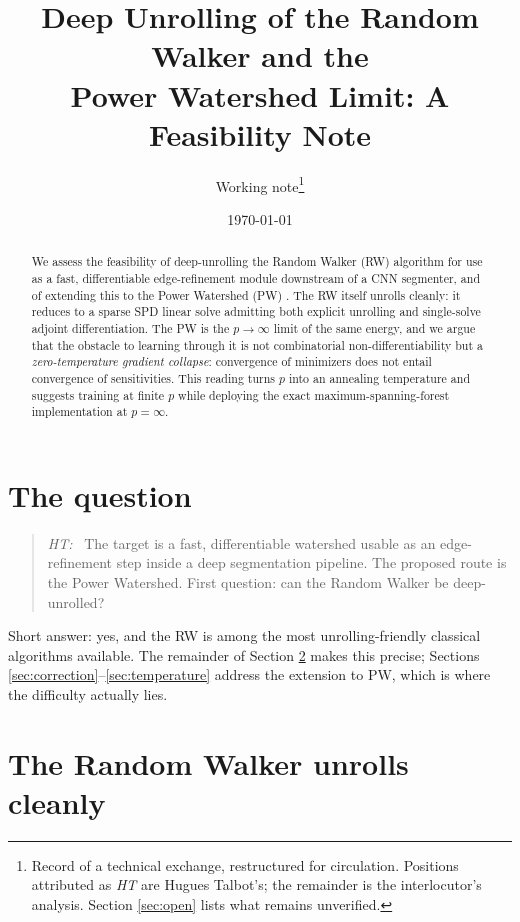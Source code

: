 \documentclass[11pt,a4paper]{article}
\title{Deep Unrolling of the Random Walker and the\\
       Power Watershed Limit: A Feasibility Note}
\author{Working note\thanks{Record of a technical exchange, restructured
        for circulation. Positions attributed as \emph{HT} are Hugues
        Talbot's; the remainder is the interlocutor's analysis. Section
        \ref{sec:open} lists what remains unverified.}}
\date{\today}
\newenvironment{position}[1]
  {\begin{quote}\noindent\textit{#1:}\ }
  {\end{quote}}
\theoremstyle{definition}
\begin{document}
\maketitle

\begin{abstract}
We assess the feasibility of deep-unrolling the Random Walker (RW)
algorithm \citep{grady2006random} for use as a fast, differentiable
edge-refinement module downstream of a CNN segmenter, and of extending
this to the Power Watershed (PW) \citep{couprie2011power}. The RW itself
unrolls cleanly: it reduces to a sparse SPD linear solve admitting both
explicit unrolling and single-solve adjoint differentiation. The PW is
the $p\to\infty$ limit of the same energy, and we argue that the
obstacle to learning through it is not combinatorial non-differentiability
but a \emph{zero-temperature gradient collapse}: convergence of minimizers
does not entail convergence of sensitivities. This reading turns $p$ into
an annealing temperature and suggests training at finite $p$ while
deploying the exact maximum-spanning-forest implementation at
$p=\infty$.
\end{abstract}

\section{The question}

\begin{position}{HT}
The target is a fast, differentiable watershed usable as an edge-refinement
step inside a deep segmentation pipeline. The proposed route is the Power
Watershed. First question: can the Random Walker be deep-unrolled?
\end{position}

\noindent
Short answer: yes, and the RW is among the most unrolling-friendly
classical algorithms available. The remainder of Section \ref{sec:rw}
makes this precise; Sections \ref{sec:correction}--\ref{sec:temperature}
address the extension to PW, which is where the difficulty actually lies.

\section{The Random Walker unrolls cleanly}
\label{sec:rw}
\end{document}
